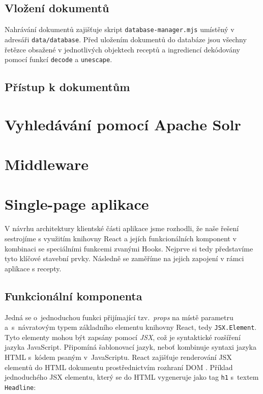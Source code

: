 \subsection{Vložení dokumentů}

Nahrávání dokumentů zajišťuje skript \texttt{database-manager.mjs} umístěný v adresáři \texttt{data/database}. Před uložením dokumentů do databáze jsou všechny řetězce obsažené v jednotlivých objektech receptů a ingrediencí dekódovány pomocí funkcí \texttt{decode} a \texttt{unescape}.

\subsection{Přístup k dokumentům}

\section{Vyhledávání pomocí Apache Solr}


\section{Middleware}


\section{Single-page aplikace}

V návrhu architektury klientské části aplikace jsme rozhodli, že naše řešení sestrojíme s využitím knihovny React a jejích funkcionálních komponent v kombinaci se speciálními funkcemi zvanými Hooks. Nejprve si tedy představíme tyto klíčové stavební prvky. Následně se zaměříme na jejich zapojení v rámci aplikace s recepty.

\subsection{Funkcionální komponenta}

Jedná se o~jednoduchou funkci přijímající tzv.~\emph{props} na místě parametru a~s~návratovým typem základního elementu knihovny React, tedy \texttt{JSX.Element}. Tyto elementy mohou být zapsány pomocí \emph{JSX}, což je syntaktické rozšíření jazyka JavaScript. Připomíná šablonovací jazyk, neboť kombinuje syntaxi jazyka HTML s~kódem psaným v~JavaScriptu. React zajišťuje renderování JSX elementů do HTML dokumentu prostřednictvím rozhraní DOM \citep{jsx-intro}. Příklad jednoduchého JSX elementu, který se do HTML vygeneruje jako tag \texttt{h1} s~textem \texttt{Headline}:

